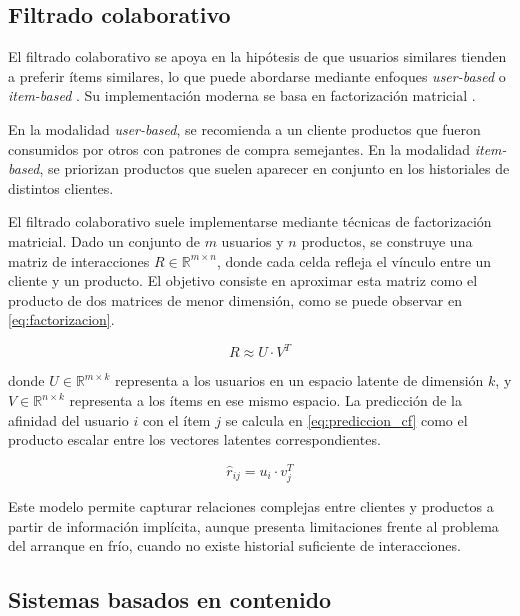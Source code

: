 \subsection{Filtrado colaborativo}

El filtrado colaborativo se apoya en la hipótesis de que usuarios similares tienden a preferir ítems similares, lo que puede abordarse mediante enfoques \textit{user-based} o \textit{item-based} \cite{ARTICLE:Sarwar2001}. Su implementación moderna se basa en factorización matricial \cite{ARTICLE:Koren2009}.

En la modalidad \textit{user-based}, se recomienda a un cliente productos que fueron consumidos por otros con patrones de compra semejantes. En la modalidad \textit{item-based}, se priorizan productos que suelen aparecer en conjunto en los historiales de distintos clientes. 

El filtrado colaborativo suele implementarse mediante técnicas de factorización matricial. Dado un conjunto de $m$ usuarios y $n$ productos, se construye una matriz de interacciones $R \in \mathbb{R}^{m \times n}$, donde cada celda refleja el vínculo entre un cliente y un producto. El objetivo consiste en aproximar esta matriz como el producto de dos matrices de menor dimensión, como se puede observar en \ref{eq:factorizacion}.

\begin{equation}
\label{eq:factorizacion}
R \approx U \cdot V^T
\end{equation}

donde $U \in \mathbb{R}^{m \times k}$ representa a los usuarios en un espacio latente de dimensión $k$, y $V \in \mathbb{R}^{n \times k}$ representa a los ítems en ese mismo espacio. La predicción de la afinidad del usuario $i$ con el ítem $j$ se calcula en \ref{eq:prediccion_cf} como el producto escalar entre los vectores latentes correspondientes.

\begin{equation}
\label{eq:prediccion_cf}
\hat{r}_{ij} = u_i \cdot v_j^T
\end{equation}

Este modelo permite capturar relaciones complejas entre clientes y productos a partir de información implícita, aunque presenta limitaciones frente al problema del arranque en frío, cuando no existe historial suficiente de interacciones.

\subsection{Sistemas basados en contenido}

